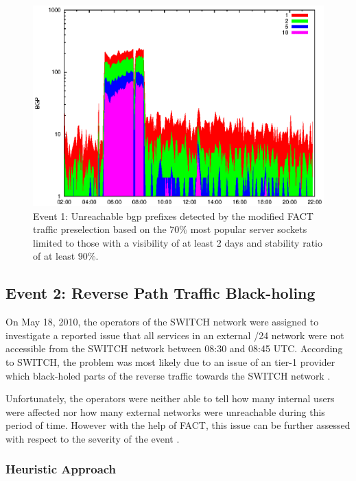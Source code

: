 \begin{figure}
	[p] \centering 
	\includegraphics[width=0.75\linewidth]{images/events/2010_03_25/bgp_log_Set_var_0_1_stab_9_vts_2.eps} \caption{Event 1: Unreachable \gls{bgp} prefixes detected by the modified \gls{FACT} traffic preselection based on the $70\%$ most popular \glspl{server socket} limited to those with a visibility of at least 2 days and stability ratio of at least $90\%$.} 
	\label{fig:AMS_IX_FACT_popularVTS2STAB9} 
\end{figure}

\newpage 
\subsection{Event 2: Reverse Path Traffic Black-holing}

On May 18, 2010, the operators of the SWITCH network were assigned to investigate a reported issue that all services in an external /24 network were not accessible from the SWITCH network between 08:30 and 08:45 UTC. 
According to SWITCH, the problem was most likely due to an issue of an tier-1 provider which black-holed parts of the reverse traffic towards the SWITCH network \citep{SchatzmannPAM2011}.

Unfortunately, the operators were neither able to tell how many internal users were affected nor how many external networks were unreachable during this period of time. 
However with the help of \gls{FACT}, this issue can be further assessed with respect to the severity of the event \citep{SchatzmannPAM2011}.

\subsubsection{Heuristic Approach}

